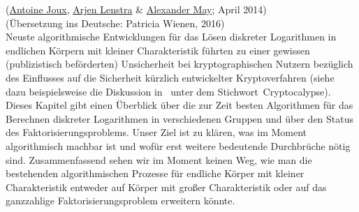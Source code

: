 \begin{refsegment}
\label{Chapter_Dlog-FactoringDead}

(\hyperlink{author_Antoine-Joux}{Antoine Joux}, \hyperlink{author_Arjen-Lenstra}{Arjen Lenstra} \& \hyperlink{author_Alexander-May}{Alexander May}; April 2014)\\

\noindent (Übersetzung ins Deutsche: Patricia Wienen, 2016)\\



Neuste algorithmische Entwicklungen für das Lösen diskreter Logarithmen in endlichen
Körpern mit kleiner Charakteristik führten zu einer gewissen (publizistisch beförderten)
Unsicherheit bei kryptographischen Nutzern bezüglich des Einflusses auf die Sicherheit kürzlich entwickelter Kryptoverfahren (siehe dazu beispielsweise die Diskussion in~\cite{Blackhat2013} unter dem Stichwort~\glqq Cryptocalypse\grqq).   Dieses Kapitel gibt einen Überblick über die zur Zeit besten Algorithmen für das Berechnen diskreter Logarithmen in verschiedenen Gruppen und über den Status des Faktorisierungsproblems. Unser Ziel ist zu klären, was im Moment algorithmisch machbar ist und wofür erst weitere bedeutende Durchbrüche nötig sind. Zusammenfassend sehen wir im Moment keinen Weg, wie man die bestehenden algorithmischen Prozesse für endliche Körper mit kleiner Charakteristik entweder auf Körper mit großer Charakteristik oder auf das ganzzahlige Faktorisierungsproblem erweitern könnte.



\end{refsegment}
